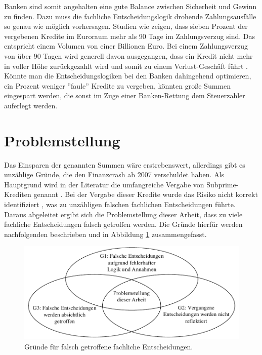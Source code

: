 Banken sind somit angehalten eine gute Balance zwischen Sicherheit und Gewinn zu finden. Dazu muss die fachliche Entscheidungslogik drohende Zahlungsausfälle so genau wie möglich vorhersagen. Studien wie \cite[]{IM17} zeigen, dass sieben Prozent der vergebenen Kredite im Euroraum mehr als 90 Tage im Zahlungsverzug sind. Das entspricht einem Volumen von einer Billionen Euro. Bei einem Zahlungsverzug von über 90 Tagen wird generell davon ausgegangen, dass ein Kredit nicht mehr in voller Höhe zurückgezahlt wird und somit zu einem Verlust-Geschäft führt \cite[vgl. S. 8]{BF05}. Könnte man die Entscheidungslogiken bei den Banken dahingehend optimieren, ein Prozent weniger ''faule'' Kredite zu vergeben, könnten große Summen eingespart werden, die sonst im Zuge einer Banken-Rettung dem Steuerzahler auferlegt werden.        

\section{Problemstellung}
\label{sec:Problemstellung1}

Das Einsparen der genannten Summen wäre erstrebenswert, allerdings gibt es unzählige Gründe, die den Finanzcrash ab 2007 verschuldet haben. Als Hauptgrund wird in der Literatur die umfangreiche Vergabe von Subprime-Krediten genannt \cite[]{MB09, WN09}. Bei der Vergabe dieser Kredite wurde das Risiko nicht korrekt identifiziert \cite[vgl. S. 3]{WN09}, was zu unzähligen falschen fachlichen Entscheidungen führte. Daraus abgeleitet ergibt sich die Problemstellung dieser Arbeit, dass zu viele fachliche Entscheidungen falsch getroffen werden. Die Gründe hierfür werden nachfolgenden beschrieben und in Abbildung \ref{fig:Gruende} zusammengefasst.   

\begin{figure}[ht] 
\centering
\includegraphics{images/gruende.pdf}
\caption{Gründe für falsch getroffene fachliche Entscheidungen.}
\label{fig:Gruende}
\end{figure}

